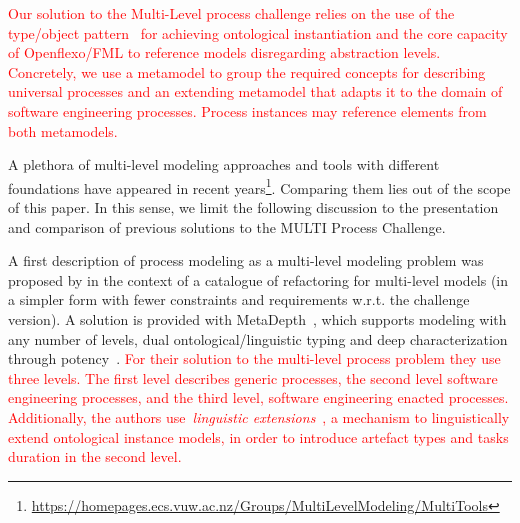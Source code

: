 

\textcolor{red}{Our solution to the Multi-Level process challenge relies on the use of the type/object pattern~\citep{typeObject} for achieving ontological instantiation and the core capacity of Openflexo/FML to reference models disregarding abstraction levels. Concretely, we use a metamodel to group the required concepts for describing universal processes and an extending metamodel that adapts it to the domain of software engineering processes. Process instances may reference elements from both metamodels.}

A plethora of multi-level modeling approaches and tools with different foundations have appeared in recent years\footnote{\url{https://homepages.ecs.vuw.ac.nz/Groups/MultiLevelModeling/MultiTools}}. Comparing them lies out of the scope of this paper. In this sense, we limit the following discussion to the presentation and comparison of previous solutions to the MULTI Process Challenge.

A first description of process modeling as a multi-level modeling problem was proposed by \parencite{lara2018refactoring} in the context of a catalogue of refactoring for multi-level models (in a simpler form with fewer constraints and requirements w.r.t. the challenge version). A solution is provided with MetaDepth~\parencite{metadepth}, which supports modeling with any number of levels, dual ontological/linguistic typing and deep characterization through potency~\citep{potency}. \textcolor{red}{For their solution to the multi-level process problem they use three levels. The first level describes generic processes, the second level software engineering processes, and the third level, software engineering enacted processes. Additionally, the authors use~\emph{linguistic extensions}~\citep{metadepth}, a mechanism to  linguistically extend ontological instance models, in order to introduce artefact types and tasks duration in the second level.}

